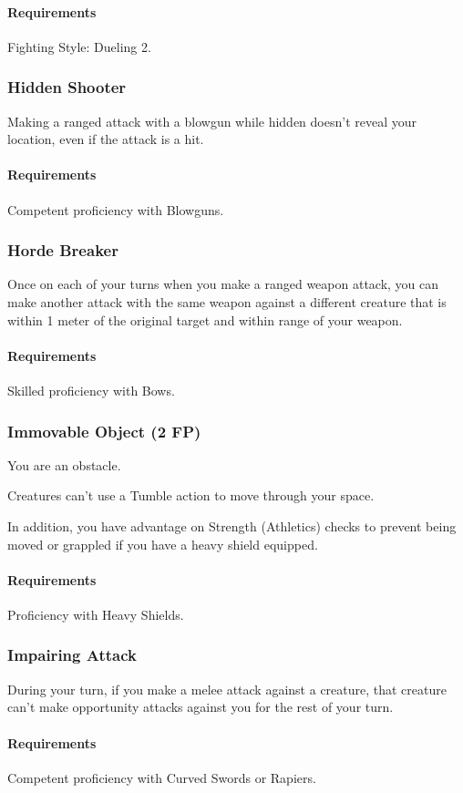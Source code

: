    \paragraph{Requirements} Fighting Style: Dueling 2.
\subsubsection{Hidden Shooter} \label{feat::hiddenshooter}
    Making a ranged attack with a blowgun while hidden doesn't reveal your location, even if the attack is a hit.
    \paragraph{Requirements} Competent proficiency with Blowguns.
\subsubsection{Horde Breaker} \label{feat::hordebreaker}
    Once on each of your turns when you make a ranged weapon attack, you can make another attack with the same weapon against a different creature that is within 1 meter of the original target and within range of your weapon.
    \paragraph{Requirements} Skilled proficiency with Bows.
\subsubsection{Immovable Object (2 FP)} \label{feat::immovableobject}
    You are an obstacle.

    Creatures can't use a Tumble action to move through your space.

    In addition, you have advantage on Strength (Athletics) checks to prevent being moved or grappled if you have a heavy shield equipped.
    \paragraph{Requirements} Proficiency with Heavy Shields.
\subsubsection{Impairing Attack} \label{feat::impairingattack}
    During your turn, if you make a melee attack against a creature, that creature can't make opportunity attacks against you for the rest of your turn.
    \paragraph{Requirements} Competent proficiency with Curved Swords or Rapiers.
